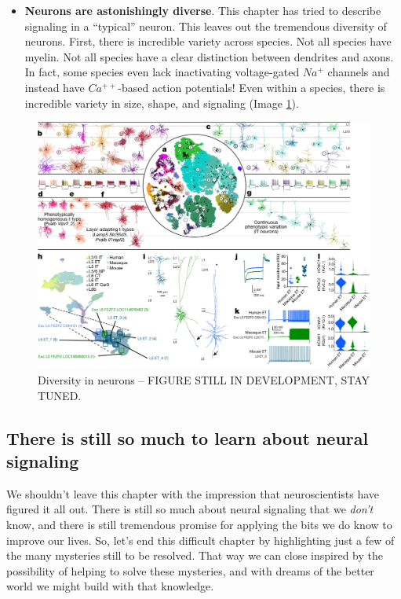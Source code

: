 \documentclass[
]{book}
\begin{document}
\begin{itemize}
\item
  \textbf{Neurons are astonishingly diverse}. This chapter has tried to describe signaling in a ``typical'' neuron. This leaves out the tremendous diversity of neurons. First, there is incredible variety across species. Not all species have myelin. Not all species have a clear distinction between dendrites and axons. In fact, some species even lack inactivating voltage-gated \(Na^+\) channels and instead have \(Ca^{++}\)-based action potentials! Even within a species, there is incredible variety in size, shape, and signaling (Image \ref{fig:neuron-diversity}).
\end{itemize}

\begin{figure}

{\centering \includegraphics[width=0.9\linewidth]{images/ch02/02_32} 

}

\caption{Diversity in neurons -- FIGURE STILL IN DEVELOPMENT, STAY TUNED.}\label{fig:neuron-diversity}
\end{figure}

\hypertarget{there-is-still-so-much-to-learn-about-neural-signaling}{%
\subsection{There is still so much to learn about neural signaling}\label{there-is-still-so-much-to-learn-about-neural-signaling}}

We shouldn't leave this chapter with the impression that neuroscientists have figured it all out. There is still so much about neural signaling that we \emph{don't} know, and there is still tremendous promise for applying the bits we do know to improve our lives. So, let's end this difficult chapter by highlighting just a few of the many mysteries still to be resolved. That way we can close inspired by the possibility of helping to solve these mysteries, and with dreams of the better world we might build with that knowledge.
\end{document}
